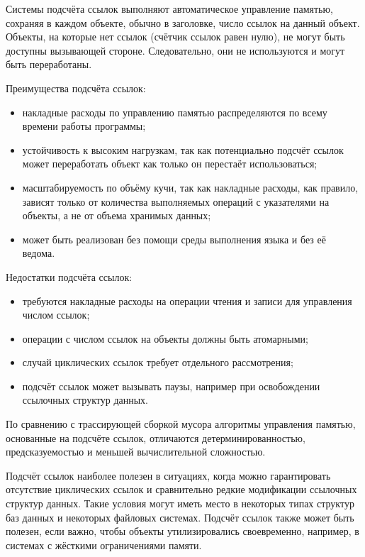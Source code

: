 Системы подсчёта ссылок выполняют автоматическое управление памятью, сохраняя в каждом объекте, обычно в заголовке, число ссылок на данный объект. Объекты, на которые нет ссылок (счётчик ссылок равен нулю), не могут быть доступны вызывающей стороне. Следовательно, они не используются и могут быть переработаны.~\cite{glossary}

Преимущества подсчёта ссылок:

\begin{itemize}[label*=---]
	\item накладные расходы по управлению памятью распределяются по всему времени работы программы;~\cite{handbook}
	\item устойчивость к высоким нагрузкам, так как потенциально подсчёт ссылок может переработать объект как только он перестаёт использоваться;~\cite{handbook}
	\item масштабируемость по объёму кучи, так как накладные расходы, как правило, зависят только от количества выполняемых операций с указателями на объекты, а не от объема хранимых данных;~\cite{handbook}
	\item может быть реализован без помощи среды выполнения языка и без её ведома.~\cite{handbook}
\end{itemize}

Недостатки подсчёта ссылок:

\begin{itemize}[label*=---]
	\item требуются накладные расходы на операции чтения и записи для управления числом ссылок;
	\item операции с числом ссылок на объекты должны быть атомарными;~\cite{handbook}
	\item случай циклических ссылок требует отдельного рассмотрения;~\cite{handbook}
	\item подсчёт ссылок может вызывать паузы, например при освобождении ссылочных структур данных.~\cite{handbook}
\end{itemize}

По сравнению с трассирующей сборкой мусора алгоритмы управления памятью, основанные на подсчёте ссылок, отличаются детерминированностью, предсказуемостью и меньшей вычислительной сложностью.~\cite{cornell2} %

Подсчёт ссылок наиболее полезен в ситуациях, когда можно гарантировать отсутствие циклических ссылок и сравнительно редкие модификации ссылочных структур данных. Такие условия могут иметь место в некоторых типах структур баз данных и некоторых файловых системах. Подсчёт ссылок также может быть полезен, если важно, чтобы объекты утилизировались своевременно, например, в системах с жёсткими ограничениями памяти.~\cite{recycling}




